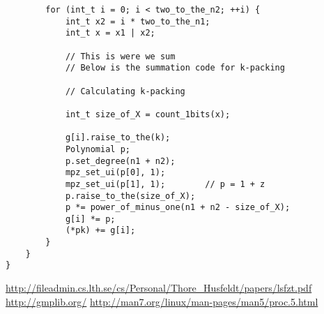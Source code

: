 \documentclass[a4paper, titlepage]{article}
\begin{document}
\begin{verbatim}
		for (int_t i = 0; i < two_to_the_n2; ++i) {
			int_t x2 = i * two_to_the_n1;
			int_t x = x1 | x2;

			// This is were we sum
			// Below is the summation code for k-packing
			
			// Calculating k-packing

			int_t size_of_X = count_1bits(x);

			g[i].raise_to_the(k);
			Polynomial p;
			p.set_degree(n1 + n2);
			mpz_set_ui(p[0], 1);
			mpz_set_ui(p[1], 1);		// p = 1 + z
			p.raise_to_the(size_of_X);
			p *= power_of_minus_one(n1 + n2 - size_of_X);
			g[i] *= p;
			(*pk) += g[i];
		}
	}
}
\end{verbatim}


\begin{thebibliography}{9}
 \url{http://fileadmin.cs.lth.se/cs/Personal/Thore_Husfeldt/papers/lsfzt.pdf}
 \url{http://gmplib.org/}
 \url{http://man7.org/linux/man-pages/man5/proc.5.html}
\end{thebibliography}
\end{document}
